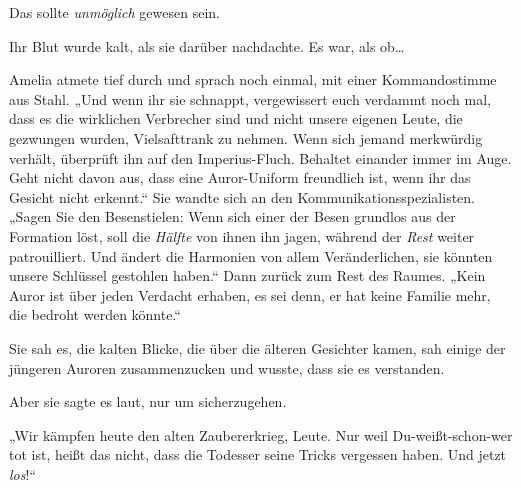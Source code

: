 Das sollte \emph{unmöglich} gewesen sein.

Ihr Blut wurde kalt, als sie darüber nachdachte. Es war, als ob…

Amelia atmete tief durch und sprach noch einmal, mit einer Kommandostimme aus Stahl.
„Und wenn ihr sie schnappt, vergewissert euch verdammt noch mal, dass es die wirklichen Verbrecher sind und nicht unsere eigenen Leute, die gezwungen wurden, Vielsafttrank zu nehmen. Wenn sich jemand merkwürdig verhält, überprüft ihn auf den Imperius-Fluch. Behaltet einander immer im Auge. Geht nicht davon aus, dass eine Auror-Uniform freundlich ist, wenn ihr das Gesicht nicht erkennt.“ Sie wandte sich an den Kommunikationsspezialisten.
„Sagen Sie den Besenstielen: Wenn sich einer der Besen grundlos aus der Formation löst, soll die \emph{Hälfte} von ihnen ihn jagen, während der \emph{Rest} weiter patrouilliert. Und ändert die Harmonien von allem Veränderlichen, sie könnten unsere Schlüssel gestohlen haben.“ Dann zurück zum Rest des Raumes.
„Kein Auror ist über jeden Verdacht erhaben, es sei denn, er hat keine Familie mehr, die bedroht werden könnte.“

Sie sah es, die kalten Blicke, die über die älteren Gesichter kamen, sah einige der jüngeren Auroren zusammenzucken und wusste, dass sie es verstanden.

Aber sie sagte es laut, nur um sicherzugehen.

„Wir kämpfen heute den alten Zaubererkrieg, Leute. Nur weil Du-weißt-schon-wer tot ist, heißt das nicht, dass die Todesser seine Tricks vergessen haben. Und jetzt \emph{los}!“


